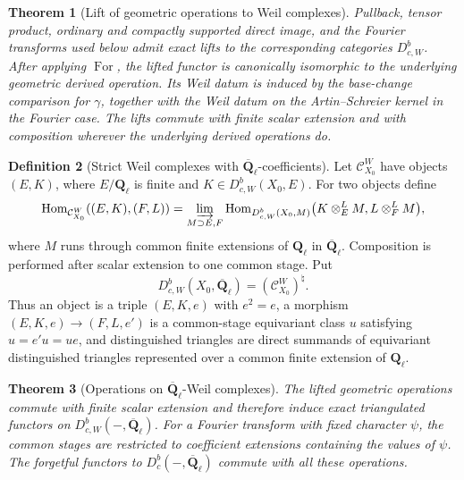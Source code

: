 \documentclass[10pt]{article}
\newtheorem{theorem}{Theorem}[section]
\theoremstyle{definition}
\newtheorem{definition}[theorem]{Definition}
\newcommand{\Ql}{\mathbf Q_\ell}
\newcommand{\Qlb}{\overline{\mathbf Q}_\ell}
\newcommand{\Dbc}{D^b_c}
\newcommand{\DbcW}{D^b_{c,W}}
\begin{document}
\begin{theorem}[Lift of geometric operations to Weil complexes]
Pullback, tensor product, ordinary and compactly supported direct image, and
the Fourier transforms used below admit exact lifts to the corresponding
categories \(\DbcW\).  After applying \(\operatorname{For}\), the lifted
functor is canonically isomorphic to the underlying geometric derived
operation.  Its Weil datum is induced by the base-change comparison for
\(\gamma\), together with the Weil datum on the Artin--Schreier kernel in
the Fourier case.  The lifts commute with finite scalar extension and with
composition wherever the underlying derived operations do.
\end{theorem}

\begin{definition}[Strict Weil complexes with \(\Qlb\)-coefficients]
Let \(\mathcal C^W_{X_0}\) have objects \((E,K)\), where \(E/\Ql\) is
finite and \(K\in\DbcW(X_0,E)\).  For two objects define
\[
 \operatorname{Hom}_{\mathcal C^W_{X_0}}((E,K),(F,L))
 =\varinjlim_{M\supset E,F}
 \operatorname{Hom}_{\DbcW(X_0,M)}
 \bigl(K\otimes_E^LM,L\otimes_F^LM\bigr),
\]
where \(M\) runs through common finite extensions of \(\Ql\) in \(\Qlb\).
Composition is performed after scalar extension to one common stage.  Put
\[
                    \DbcW(X_0,\Qlb)=(\mathcal C^W_{X_0})^\natural.
\]
Thus an object is a triple \((E,K,e)\) with \(e^2=e\), a morphism
\((E,K,e)\to(F,L,e')\) is a common-stage equivariant class \(u\) satisfying
\(u=e'u=ue\), and distinguished triangles are direct summands of
equivariant distinguished triangles represented over a common finite
extension of \(\Ql\).
\end{definition}

\begin{theorem}[Operations on \(\Qlb\)-Weil complexes]
The lifted geometric operations commute with finite scalar extension and
therefore induce exact triangulated functors on \(\DbcW(-,\Qlb)\).  For a
Fourier transform with fixed character \(\psi\), the common stages are
restricted to coefficient extensions containing the values of \(\psi\).
The forgetful functors to \(\Dbc(-,\Qlb)\) commute with all these operations.
\end{theorem}
\end{document}
